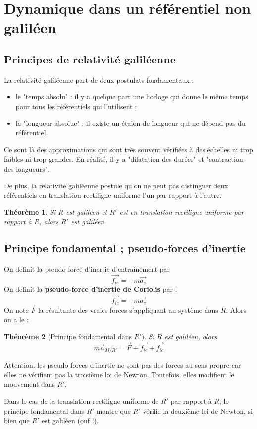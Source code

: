 \documentclass[french]{book}
\theoremstyle{plain}
\newtheorem{thm}{Théorème}
\theoremstyle{definition}
\theoremstyle{remark}
\begin{document}
\section{Dynamique dans un référentiel non galiléen}
\subsection{Principes de relativité galiléenne}
La relativité galiléenne part de deux postulats fondamentaux :
\begin{itemize}
	\item le "temps absolu" : il y a quelque part une horloge qui donne le même temps pour tous les référentiels qui l'utilisent ;
	\item la "longueur absolue" : il existe un étalon de longueur qui ne dépend pas du référentiel.
\end{itemize}
Ce sont là des approximations qui sont très souvent vérifiées à des échelles ni trop faibles ni trop grandes. En réalité, il y a "dilatation des durées" et "contraction des longueurs". \\ \par De plus, la relativité galiléenne postule qu'on ne peut pas distinguer deux référentiels en translation rectiligne uniforme l'un par rapport à l'autre.
\begin{thm}
	Si $R$ est galiléen et $R'$ est en translation rectiligne uniforme par rapport à $R$, alors $R'$ est galiléen.
\end{thm}

\subsection{Principe fondamental ; pseudo-forces d'inertie}
On définit la pseudo-force d'inertie d'entraînement\textbf{} par $$\overrightarrow{f_{ie}}=-m\overrightarrow{a_e}$$ On définit la \textbf{pseudo-force d'inertie de Coriolis} par : $$\overrightarrow{f_{ic}}=-m\overrightarrow{a_c}$$
On note $\overrightarrow{F}$ la résultante des vraies forces s'appliquant au système dans $R$. Alors on a le :
\begin{thm}[Principe fondamental dans $R'$]
	Si $R$ est galiléen, alors $$m\overrightarrow{a}_{M/R'}=\overrightarrow{F}+\overrightarrow{f_{ie}}+\overrightarrow{f_{ic}}$$
\end{thm}
Attention, les pseudo-forces d'inertie ne sont pas des forces au sens propre car elles ne vérifient pas la troisième loi de Newton. Toutefois, elles modifient le mouvement dans $R'$. \\ \par Dans le cas de la translation rectiligne uniforme de $R'$ par rapport à $R$, le principe fondamental dans $R'$ montre que $R'$ vérifie la deuxième loi de Newton, si bien que $R'$ est galiléen (ouf !).
\end{document}
